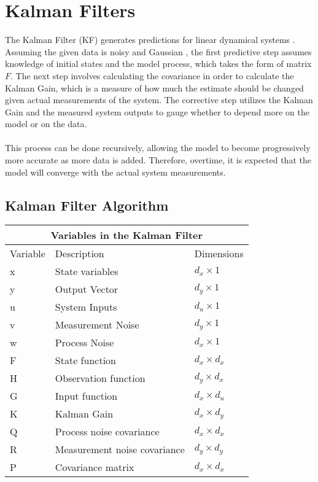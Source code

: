 \chapter{Kalman Filters}
\label{Kalman Filters}

The Kalman Filter (KF) generates predictions for linear dynamical systems \cite{inbook}. Assuming the given data is noisy and Gaussian \cite{inproceedings, article7}, the first predictive step assumes knowledge of initial states and the model process, which takes the form of matrix $F$. The next step involves calculating the covariance in order to calculate the Kalman Gain, which is a measure of how much the estimate should be changed given actual measurements of the system. The corrective step utilizes the Kalman Gain and the measured system outputs to gauge whether to depend more on the model or on the data.  \\ \\
This process can be done recursively, allowing the model to become progressively more accurate as more data is added. Therefore, overtime, it is expected that the model will converge with the actual system measurements.


\section{Kalman Filter Algorithm}
\begin{center}
\centering
\begin{tabular}{ |p{2cm}||p{5cm}|p{2cm}| }
    \hline
    \multicolumn{3}{|c|}{Variables in the Kalman Filter } \\ 
    \hline
    Variable & Description & Dimensions \\
    \hline
    x & State variables  & $d_x \times 1$ \\
    y & Output Vector  & $d_y \times 1$ \\
    u & System Inputs  & $d_u \times 1$\\
    v & Measurement Noise & $d_y \times 1$\\
    w & Process Noise & $d_x \times 1$\\
    F & State function  & $d_x \times d_x $  \\ 
    H & Observation function & $d_y \times d_x$\\
    G & Input function & $d_x \times d_u$\\
    K & Kalman Gain  & $d_x \times d_y$\\
    Q & Process noise covariance  & $d_x \times d_x$ \\
    R & Measurement noise covariance &  $d_y \times d_y$\\
    P & Covariance matrix & $d_x \times d_x $  \\ 
    
    \hline
\end{tabular}
\end{center} 


